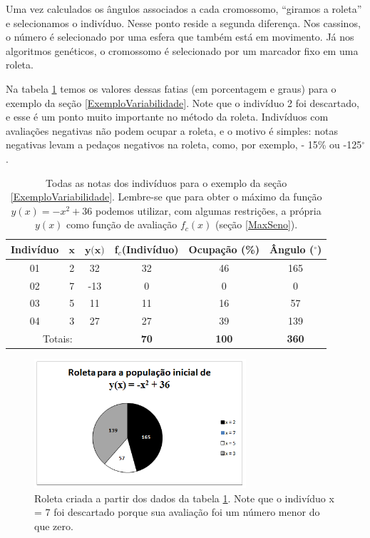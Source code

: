 	Uma vez calculados os ângulos associados a cada cromossomo, ``giramos a roleta'' e selecionamos o indivíduo. Nesse ponto reside a segunda diferença. Nos cassinos, o número é selecionado por uma esfera que também está em movimento. Já nos algoritmos genéticos, o cromossomo é selecionado por um marcador fixo em uma roleta.
	
	Na tabela \ref{tabSumFitness} temos os valores dessas fatias (em porcentagem e graus) para o exemplo da seção \ref{ExemploVariabilidade}. Note que o indivíduo 2 foi descartado, e esse é um ponto muito importante no método da roleta. Indivíduos com avaliações negativas não podem ocupar a roleta, e o motivo é simples: notas negativas levam a pedaços negativos na roleta, como, por exemplo, - 15\% ou -125$^\circ$.
		
	\begin{table}[htp]		
		\caption{\label{tabSumFitness}Todas as notas dos indivíduos para o exemplo da seção \ref{ExemploVariabilidade}. Lembre-se que para obter o máximo da função $y(x) = -x^2 + 36$ podemos utilizar, com algumas restrições, a própria $y(x)$ como função de avaliação $f_c(x)$ (seção \ref{MaxSeno}).}
		\begin{center}
			\begin{tabular}{cccccc}
				\hline
				\textbf{Indivíduo}	& $\textbf{x}$		& $\textbf{y(x)}$	& \textbf{f$_c$(Indivíduo)} & \textbf{Ocupação (\%)} & \textbf{Ângulo ($^\circ$)} \\
				\hline
				01	& 2	& 32  & 32 	& 46	& 165 						\\
				02	& 7	& -13 & 0		& 0		& 0						\\
				03	&	5	& 11	& 11	& 16	& 57						\\	
				04	&	3	& 27	& 27	& 39	& 139						\\
				\hline
				\multicolumn{3}{c|}{Totais:}  & \textbf{70} & \textbf{100} & \textbf{360} \\
				\hline
			\end{tabular}
		\end{center}
	\end{table}
	
	
	\begin{figure}[htp]
		\begin{center}
			\includegraphics[width=0.7\textwidth]{figs/ga/roleta_viciada.png}
		\end{center}
		\caption{\label{figRoleta}Roleta criada a partir dos dados da tabela \ref{tabSumFitness}. Note que o indivíduo x = 7 foi descartado porque sua avaliação foi um número menor do que zero.}
	\end{figure}
	
